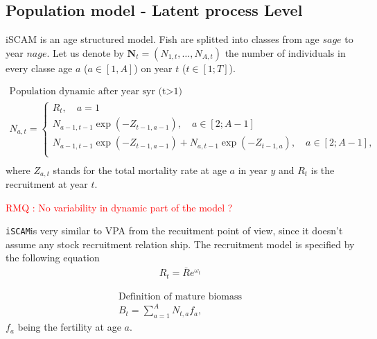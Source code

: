 \documentclass[a4paper]{article}\usepackage{graphicx, color}
\newcommand{\RMQ}[1]{\par \hspace{-2cm}\textcolor{red}{RMQ : #1 }\par }
\newcommand{\ASS}[1]{\par \textcolor{blue}{ASSUMPTION : #1}\par}
\newcommand{\iscam}{\texttt{iSCAM}}
\newcommand{\Nt}{\boldsymbol N_t}
\begin{document}
\subsection{Population model - Latent process Level}
iSCAM is an age structured model.  Fish are splitted into classes from
age $sage$ to year $nage$. Let us denote by $\Nt = (N_{1,t}, \ldots, N_{A,t})$ the number
of individuals in every classe age $a$ ($a\in [1,A]$) on year $t$ ($t\in [1;T]$).

\begin{gather}
  \mbox{Population dynamic after year syr (t>1)}\\
  N_{a,t}= \left\lbrace 
    \begin{array}{l}
      R_t, \quad a=1\\
      N_{a-1,t-1} \exp(-Z_{t-1, a-1}), \quad a\in [2;A-1]\\
      N_{a-1,t-1} \exp(-Z_{t-1, a-1}) + N_{a,t-1} \exp(-Z_{t-1, a}), \quad a\in [2;A-1],\\
    \end{array}  \right. \\
\end{gather}
 where $Z_{a,t}$  stands for the total  mortality rate at age  $a$ in
  year $y$ and $R_t$ is the recruitment at year $t$.

\RMQ{No variability in dynamic part of the model ?}


\iscam is very similar to VPA from the recuitment point of view, since
it doesn't assume any stock recruitment relation ship. The recruitment
model is specified by the following equation
\begin{gather}
  R_t =\bar{R}e^{\omega_t}
\end{gather}

\begin{gather}
\mbox{Definition of mature biomass}\\
B_t= \sum_{a=1}^A N_{t,a} f_a,
\end{gather} 
$f_a$ being the fertility at age $a$. 
\end{document}
